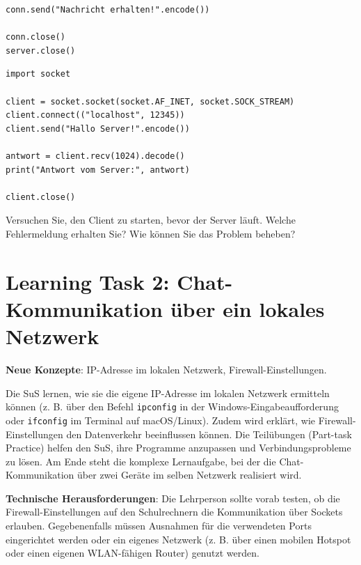 \begin{myexercise}
\begin{myanswer}
\begin{lstlisting}[caption=\texttt{server.py}]
conn.send("Nachricht erhalten!".encode())

conn.close()
server.close()
\end{lstlisting}
        \begin{lstlisting}[caption=\texttt{client.py}]
import socket

client = socket.socket(socket.AF_INET, socket.SOCK_STREAM)
client.connect(("localhost", 12345))
client.send("Hallo Server!".encode())

antwort = client.recv(1024).decode()
print("Antwort vom Server:", antwort)

client.close()
\end{lstlisting}
    \end{myanswer}
\end{myexercise}
\begin{mychallenge}
    Versuchen Sie, den Client zu starten, bevor der Server läuft. Welche Fehlermeldung erhalten Sie? Wie können Sie das Problem beheben?
\end{mychallenge}

\section{Learning Task 2: Chat-Kommunikation über ein lokales Netzwerk}

\begin{scaffoldBox}
    \textbf{Neue Konzepte}: IP-Adresse im lokalen Netzwerk, Firewall-Einstellungen.

    Die SuS lernen, wie sie die eigene IP-Adresse im lokalen Netzwerk ermitteln können (z. B. über den Befehl \texttt{ipconfig} in der Windows-Eingabeaufforderung oder \texttt{ifconfig} im Terminal auf macOS/Linux). Zudem wird erklärt, wie Firewall-Einstellungen den Datenverkehr beeinflussen können. Die Teilübungen (Part-task Practice) helfen den SuS, ihre Programme anzupassen und Verbindungsprobleme zu lösen. Am Ende steht die komplexe Lernaufgabe, bei der die Chat-Kommunikation über zwei Geräte im selben Netzwerk realisiert wird.

    \textbf{Technische Herausforderungen}: Die Lehrperson sollte vorab testen, ob die Firewall-Einstellungen auf den Schulrechnern die Kommunikation über Sockets erlauben. Gegebenenfalls müssen Ausnahmen für die verwendeten Ports eingerichtet werden oder ein eigenes Netzwerk (z. B. über einen mobilen Hotspot oder einen eigenen WLAN-fähigen Router) genutzt werden.
\end{scaffoldBox}

